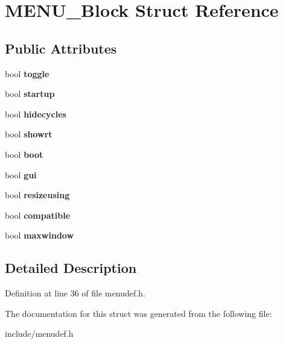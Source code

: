 \hypertarget{structMENU__Block}{\section{M\-E\-N\-U\-\_\-\-Block Struct Reference}
\label{structMENU__Block}
}
\subsection*{Public Attributes}
\begin{DoxyCompactItemize}
\item 
\hypertarget{structMENU__Block_a6c5f21b6b9199f65d85f05dbc68b7199}{bool {\bfseries toggle}}\label{structMENU__Block_a6c5f21b6b9199f65d85f05dbc68b7199}

\item 
\hypertarget{structMENU__Block_a7ff5fa9dcabef88ab98f39632a63eb59}{bool {\bfseries startup}}\label{structMENU__Block_a7ff5fa9dcabef88ab98f39632a63eb59}

\item 
\hypertarget{structMENU__Block_a3b0f7f16ac00b51acb0234ef629b0afa}{bool {\bfseries hidecycles}}\label{structMENU__Block_a3b0f7f16ac00b51acb0234ef629b0afa}

\item 
\hypertarget{structMENU__Block_a25fb23cddb1193d8938ef54ba843734a}{bool {\bfseries showrt}}\label{structMENU__Block_a25fb23cddb1193d8938ef54ba843734a}

\item 
\hypertarget{structMENU__Block_a605bed0d4d6ba34e5df039ba02bc3c19}{bool {\bfseries boot}}\label{structMENU__Block_a605bed0d4d6ba34e5df039ba02bc3c19}

\item 
\hypertarget{structMENU__Block_ab2b8594073b588217b5034212a4f2f8d}{bool {\bfseries gui}}\label{structMENU__Block_ab2b8594073b588217b5034212a4f2f8d}

\item 
\hypertarget{structMENU__Block_affa4ec1ef935e6f41ea105a6e006e525}{bool {\bfseries resizeusing}}\label{structMENU__Block_affa4ec1ef935e6f41ea105a6e006e525}

\item 
\hypertarget{structMENU__Block_a010c299923bbffd7cd8cc5d4bbcd665b}{bool {\bfseries compatible}}\label{structMENU__Block_a010c299923bbffd7cd8cc5d4bbcd665b}

\item 
\hypertarget{structMENU__Block_a3da72084c5a81c8d383e467e3c51a39c}{bool {\bfseries maxwindow}}\label{structMENU__Block_a3da72084c5a81c8d383e467e3c51a39c}

\end{DoxyCompactItemize}


\subsection{Detailed Description}


Definition at line 36 of file menudef.\-h.



The documentation for this struct was generated from the following file\-:\begin{DoxyCompactItemize}
\item 
include/menudef.\-h\end{DoxyCompactItemize}
